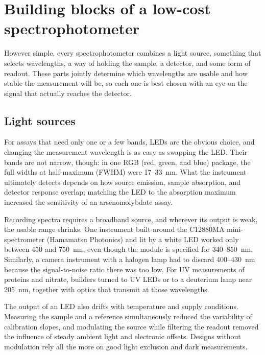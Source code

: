 \section{Building blocks of a low-cost spectrophotometer}\label{sec:components}

However simple, every spectrophotometer combines a light source, something that selects wavelengths, a way of holding the sample, a detector, and some form of readout. These parts jointly determine which wavelengths are usable and how stable the measurement will be, so each one is best chosen with an eye on the signal that actually reaches the detector.

\subsection{Light sources}

For assays that need only one or a few bands, LEDs are the obvious choice, and changing the measurement wavelength is as easy as swapping the LED.\citep{macka2014light,prairie2020accurate,jesus2025modular} Their bands are not narrow, though: in one RGB (red, green, and blue) package, the full widths at half-maximum (FWHM) were 17--33~nm.\citep{kerestes2023affordable} What the instrument ultimately detects depends on how source emission, sample absorption, and detector response overlap; matching the LED to the absorption maximum increased the sensitivity of an arsenomolybdate assay.\citep{awasthi2023portable}

Recording spectra requires a broadband source, and wherever its output is weak, the usable range shrinks. One instrument built around the C12880MA mini-spectrometer (Hamamatsu Photonics) and lit by a white LED worked only between 450 and 750~nm, even though the module is specified for 340--850~nm.\citep{laganovska2020portable} Similarly, a camera instrument with a halogen lamp had to discard 400--430~nm because the signal-to-noise ratio there was too low.\citep{edwards2017smartphone} For UV measurements of proteins and nitrate, builders turned to UV LEDs or to a deuterium lamp near 205~nm, together with optics that transmit at those wavelengths.\citep{poh2021spectrophotometer,booysen2021water}

The output of an LED also drifts with temperature and supply conditions.\citep{macka2014light,pereira2019low} Measuring the sample and a reference simultaneously reduced the variability of calibration slopes,\citep{bogucki2019d} and modulating the source while filtering the readout removed the influence of steady ambient light and electronic offsets.\citep{prairie2020accurate} Designs without modulation rely all the more on good light exclusion and dark measurements.\citep{cirrone2025low}

